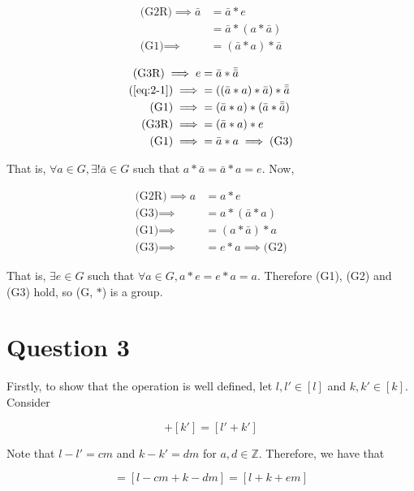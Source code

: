 \documentclass{article}
\begin{document}
\begin{align}
    \text{(G2R)} \implies \bar{a} &= \bar{a} \ast e \nonumber\\
    &= \bar{a} \ast (a \ast \bar{a}) \nonumber\\
    \text{(G1)} \implies &= (\bar{a} \ast a) \ast \bar{a} \label{eq:2-1}
\end{align}

\begin{align*}
    \text{(G3R)} \implies e &= \bar{a} \ast \bar{\bar{a}}\\
    \text{(\ref{eq:2-1})} \implies &= ((\bar{a} \ast a) \ast \bar{a}) \ast \bar{\bar{a}}\\
    \text{(G1)} \implies &= (\bar{a} \ast a) \ast (\bar{a} \ast \bar{\bar{a}})\\
    \text{(G3R)} \implies &= (\bar{a} \ast a) \ast e\\
    \text{(G1)} \implies &= \bar{a} \ast a \implies \text{(G3)}
\end{align*}

That is, $\forall a \in G, \exists! \bar{a} \in G$ such that $a \ast \bar{a} = \bar{a} \ast a = e$. Now,

\begin{align*}
    \text{(G2R)} \implies a &= a \ast e\\
    \text{(G3)} \implies &= a \ast (\bar{a} \ast a)\\
    \text{(G1)} \implies &= (a \ast \bar{a}) \ast a\\
    \text{(G3)} \implies &= e \ast a \implies \text{(G2)}
\end{align*}

That is, $\exists e \in G$ such that $\forall a \in G, a \ast e = e \ast a = a$. Therefore (G1), (G2) and (G3) hold, so (G, $\ast$) is a group.

\section*{Question 3}

Firstly, to show that the operation is well defined, let $l, l' \in [l]$ and $k, k' \in [k]$. Consider

\begin{equation*}
    [l'] + [k'] = [l' + k']
\end{equation*}

Note that $l - l' = cm$ and $k - k' = dm$ for $a, d \in \mathbb{Z}$. Therefore, we have that

\begin{equation*}
    [l' + k'] = [l - cm + k - dm] = [l + k + em]
\end{equation*}
\end{document}
